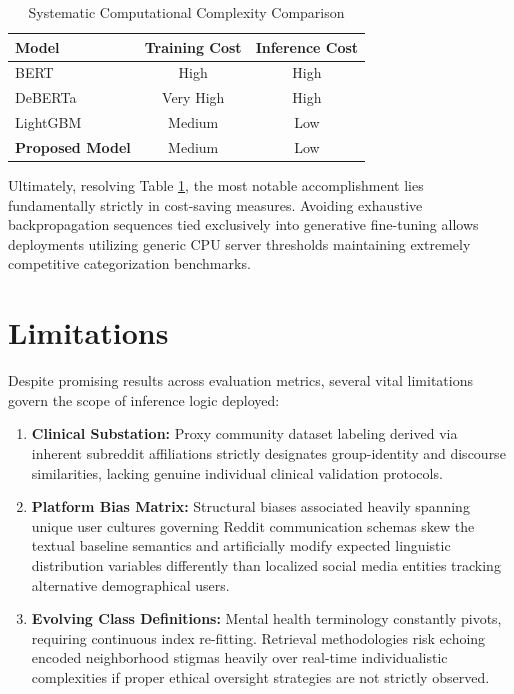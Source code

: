 \documentclass[11pt]{article}
\begin{document}
\begin{table}[H]
\centering
\caption{Systematic Computational Complexity Comparison}
\begin{tabular}{lcc}
\toprule
Model & Training Cost & Inference Cost \\
\midrule
BERT & High & High \\
DeBERTa & Very High & High \\
LightGBM & Medium & Low \\
\textbf{Proposed Model} & Medium & Low \\
\bottomrule
\end{tabular}
\label{tab:complexity}
\end{table}

Ultimately, resolving Table \ref{tab:complexity}, the most notable accomplishment lies fundamentally strictly in cost-saving measures. Avoiding exhaustive backpropagation sequences tied exclusively into generative fine-tuning allows deployments utilizing generic CPU server thresholds maintaining extremely competitive categorization benchmarks.

\section{Limitations}

Despite promising results across evaluation metrics, several vital limitations govern the scope of inference logic deployed:
\begin{enumerate}
    \item \textbf{Clinical Substation:} Proxy community dataset labeling derived via inherent subreddit affiliations strictly designates group-identity and discourse similarities, lacking genuine individual clinical validation protocols.
    \item \textbf{Platform Bias Matrix:} Structural biases associated heavily spanning unique user cultures governing Reddit communication schemas skew the textual baseline semantics and artificially modify expected linguistic distribution variables differently than localized social media entities tracking alternative demographical users.
    \item \textbf{Evolving Class Definitions:} Mental health terminology constantly pivots, requiring continuous index re-fitting. Retrieval methodologies risk echoing encoded neighborhood stigmas heavily over real-time individualistic complexities if proper ethical oversight strategies are not strictly observed.
\end{enumerate}
\end{document}
